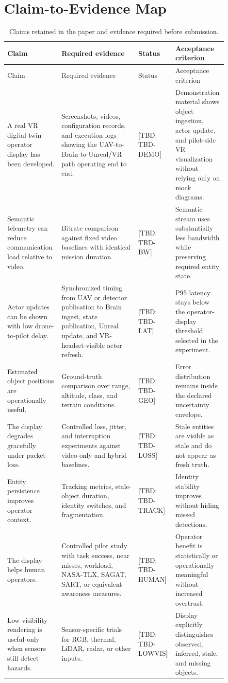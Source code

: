 \documentclass[11pt,a4paper]{article}
\newcommand{\tbd}[1]{\textcolor{publicationred}{[TBD: #1]}}
\begin{document}
\section{Claim-to-Evidence Map}

\small
\begin{longtable}{@{}L{0.24\linewidth}L{0.34\linewidth}L{0.14\linewidth}L{0.18\linewidth}@{}}
\caption{Claims retained in the paper and evidence required before submission.}
\label{tab:claim-evidence}\\
\toprule
Claim & Required evidence & Status & Acceptance criterion \\
\midrule
\endfirsthead
\toprule
Claim & Required evidence & Status & Acceptance criterion \\
\midrule
\endhead
A real VR digital-twin operator display has been developed. & Screenshots, videos, configuration records, and execution logs showing the UAV-to-Brain-to-Unreal/VR path operating end to end. & \tbd{TBD-DEMO} & Demonstration material shows object ingestion, actor update, and pilot-side VR visualization without relying only on mock diagrams. \\
Semantic telemetry can reduce communication load relative to video. & Bitrate comparison against fixed video baselines with identical mission duration. & \tbd{TBD-BW} & Semantic stream uses substantially less bandwidth while preserving required entity state. \\
Actor updates can be shown with low drone-to-pilot delay. & Synchronized timing from UAV or detector publication to Brain ingest, state publication, Unreal update, and VR-headset-visible actor refresh. & \tbd{TBD-LAT} & P95 latency stays below the operator-display threshold selected in the experiment. \\
Estimated object positions are operationally useful. & Ground-truth comparison over range, altitude, class, and terrain conditions. & \tbd{TBD-GEO} & Error distribution remains inside the declared uncertainty envelope. \\
The display degrades gracefully under packet loss. & Controlled loss, jitter, and interruption experiments against video-only and hybrid baselines. & \tbd{TBD-LOSS} & Stale entities are visible as stale and do not appear as fresh truth. \\
Entity persistence improves operator context. & Tracking metrics, stale-object duration, identity switches, and fragmentation. & \tbd{TBD-TRACK} & Identity stability improves without hiding missed detections. \\
The display helps human operators. & Controlled pilot study with task success, near misses, workload, NASA-TLX, SAGAT, SART, or equivalent awareness measures. & \tbd{TBD-HUMAN} & Operator benefit is statistically or operationally meaningful without increased overtrust. \\
Low-visibility rendering is useful only when sensors still detect hazards. & Sensor-specific trials for RGB, thermal, LiDAR, radar, or other inputs. & \tbd{TBD-LOWVIS} & Display explicitly distinguishes observed, inferred, stale, and missing objects. \\
\bottomrule
\end{longtable}
\normalsize
\end{document}

